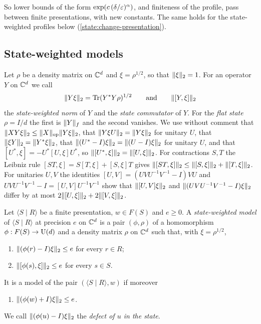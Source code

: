 So lower bounds of the form $\exp(c\,(\delta/\varepsilon)^{\alpha})$, and finiteness of the profile, pass between finite presentations, with new
constants. The same holds for the state-weighted profiles below (\cref{state:change-presentation}).

\subsection{State-weighted models}\label{prelim:models}

Let $\rho$ be a density matrix on $\mathbb C^d$ and $\xi=\rho^{1/2}$, so that $\lVert \xi\rVert_2=1$. For an operator $Y$ on $\mathbb C^d$ we call
\[
\lVert Y\xi\rVert_2=\operatorname{Tr}(Y^*Y\rho)^{1/2}\qquad\text{and}\qquad\lVert [Y,\xi]\rVert_2
\]
the \emph{state-weighted norm} of $Y$ and the \emph{state commutator} of $Y$. For the \emph{flat state} $\rho=I/d$ the first is $\lVert Y\rVert_f$
and the second vanishes. We use without comment that $\lVert XY\xi\rVert_2\le\lVert X\rVert_{\mathrm{op}}\lVert Y\xi\rVert_2$, that $\lVert Y\xi U\rVert_2=\lVert Y\xi\rVert_2$ for unitary $U$, that
$\lVert \xi Y\rVert_2=\lVert Y^*\xi\rVert_2$, that $\lVert (U^*-I)\xi\rVert_2=\lVert (U-I)\xi\rVert_2$ for unitary $U$, and that $[U^*,\xi]=-U^*[U,\xi]U^*$, so
$\lVert [U^*,\xi]\rVert_2=\lVert [U,\xi]\rVert_2$. For contractions $S,T$ the Leibniz rule $[ST,\xi]=S[T,\xi]+[S,\xi]T$ gives
$\lVert [ST,\xi]\rVert_2\le\lVert [S,\xi]\rVert_2+\lVert [T,\xi]\rVert_2$. For unitaries $U,V$ the identities $[U,V]=(UVU^{-1}V^{-1}-I)VU$ and
$UVU^{-1}V^{-1}-I=[U,V]U^{-1}V^{-1}$ show that $\lVert [U,V]\xi\rVert_2$ and $\lVert (UVU^{-1}V^{-1}-I)\xi\rVert_2$ differ by at most
$2\lVert [U,\xi]\rVert_2+2\lVert [V,\xi]\rVert_2$.

\begin{definition}\label{def:model}
Let $\langle S\mid R\rangle$ be a finite presentation, $w\in F(S)$ and $e\ge0$. A \emph{state-weighted model} of $\langle S\mid R\rangle$
at precision $e$ on $\mathbb C^d$ is a pair $(\phi,\rho)$ of a homomorphism $\phi:F(S)\to\mathrm U(d)$ and a density matrix $\rho$ on $\mathbb C^d$ such that,
with $\xi=\rho^{1/2}$,
\begin{enumerate}[label=(S\arabic*),leftmargin=3.2em]
\item\label{prelim:S1} $\lVert (\phi(r)-I)\xi\rVert_2\le e$ for every $r\in R$;
\item\label{prelim:S2} $\lVert [\phi(s),\xi]\rVert_2\le e$ for every $s\in S$.
\end{enumerate}
It is a model of the pair $(\langle S\mid R\rangle,w)$ if moreover
\begin{enumerate}[label=(S\arabic*),leftmargin=3.2em,resume]
\item\label{prelim:S3} $\lVert (\phi(w)+I)\xi\rVert_2\le e$.
\end{enumerate}
We call $\lVert (\phi(u)-I)\xi\rVert_2$ the \emph{defect of $u$ in the state}.
\end{definition}

